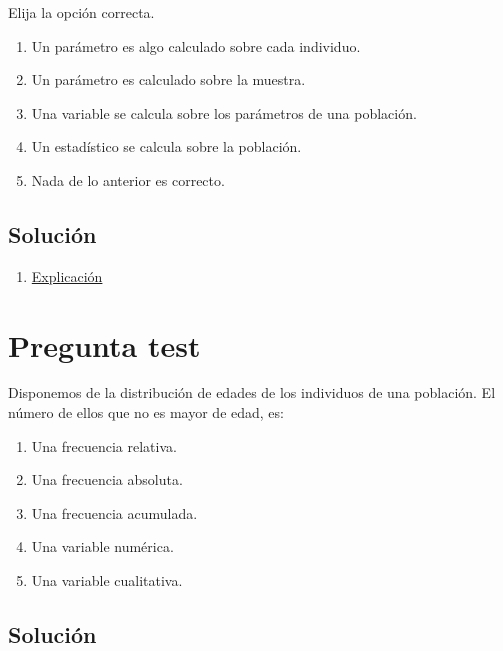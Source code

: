 \documentclass[
]{book}
\providecommand{\tightlist}{%
  \setlength{\itemsep}{0pt}\setlength{\parskip}{0pt}}
\begin{document}
Elija la opción correcta.

\begin{enumerate}
\def\labelenumi{\alph{enumi})}
\tightlist
\item
  Un parámetro es algo calculado sobre cada individuo.
\item
  Un parámetro es calculado sobre la muestra.
\item
  Una variable se calcula sobre los parámetros de una población.
\item
  Un estadístico se calcula sobre la población.
\item
  Nada de lo anterior es correcto.
\end{enumerate}

\hypertarget{soluciuxf3n-8}{%
\subsection{Solución}\label{soluciuxf3n-8}}

\begin{enumerate}
\def\labelenumi{\alph{enumi})}
\setcounter{enumi}{4}
\tightlist
\item
  \href{https://1fjmanzano.github.io/bioestadistica/conceptos-previos.html}{Explicación}
\end{enumerate}

\hypertarget{pregunta-test-9}{%
\section{Pregunta test}\label{pregunta-test-9}}

Disponemos de la distribución de edades de los individuos de una población. El número de ellos que no es mayor de edad, es:

\begin{enumerate}
\def\labelenumi{\alph{enumi})}
\tightlist
\item
  Una frecuencia relativa.
\item
  Una frecuencia absoluta.
\item
  Una frecuencia acumulada.
\item
  Una variable numérica.
\item
  Una variable cualitativa.
\end{enumerate}

\hypertarget{soluciuxf3n-9}{%
\subsection{Solución}\label{soluciuxf3n-9}}
\end{document}
